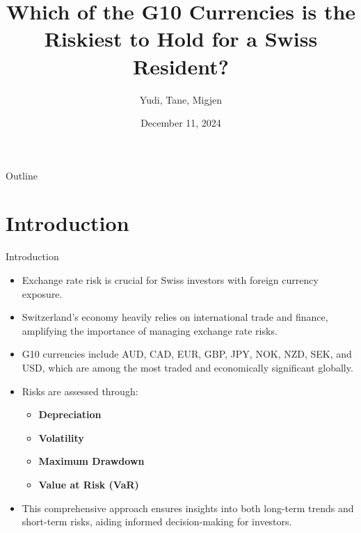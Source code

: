 \documentclass{beamer}
\title[Currency Risk Analysis]{Which of the G10 Currencies is the Riskiest to Hold for a Swiss Resident?}
\author{Yudi, Tane, Migjen}
\date{December 11, 2024}
\begin{document}
\begin{frame}
  \titlepage
\end{frame}



\begin{frame}{Outline}
  \tableofcontents
\end{frame}

\section{Introduction}
\begin{frame}{Introduction}
  \begin{itemize}
    \item Exchange rate risk is crucial for Swiss investors with foreign currency exposure.
    \item Switzerland's economy heavily relies on international trade and finance, amplifying the importance of managing exchange rate risks.
    \item G10 currencies include AUD, CAD, EUR, GBP, JPY, NOK, NZD, SEK, and USD, which are among the most traded and economically significant globally.
    \item Risks are assessed through:
    \begin{itemize}
      \item \textbf{Depreciation}
      \item \textbf{Volatility}
      \item \textbf{Maximum Drawdown} 
      \item \textbf{Value at Risk (VaR)}
    \end{itemize}
    \item This comprehensive approach ensures insights into both long-term trends and short-term risks, aiding informed decision-making for investors.
  \end{itemize}
\end{frame}



\end{document}
